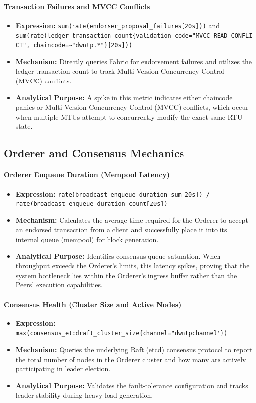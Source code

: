 \paragraph{Transaction Failures and MVCC Conflicts}
\begin{itemize}
    \item \textbf{Expression:} \verb|sum(rate(endorser_proposal_failures[20s]))| and \verb|sum(rate(ledger_transaction_count{validation_code="MVCC_READ_CONFLICT", chaincode=~"dwntp.*"}[20s]))|
    \item \textbf{Mechanism:} Directly queries Fabric for endorsement failures and utilizes the ledger transaction count to track Multi-Version Concurrency Control (MVCC) conflicts.
    \item \textbf{Analytical Purpose:} A spike in this metric indicates either chaincode panics or Multi-Version Concurrency Control (MVCC) conflicts, which occur when multiple MTUs attempt to concurrently modify the exact same RTU state.
\end{itemize}

\subsection{Orderer and Consensus Mechanics}

\paragraph{Orderer Enqueue Duration (Mempool Latency)}
\begin{itemize}
    \item \textbf{Expression:} \verb|rate(broadcast_enqueue_duration_sum[20s]) / rate(broadcast_enqueue_duration_count[20s])|
    \item \textbf{Mechanism:} Calculates the average time required for the Orderer to accept an endorsed transaction from a client and successfully place it into its internal queue (mempool) for block generation.
    \item \textbf{Analytical Purpose:} Identifies consensus queue saturation. When throughput exceeds the Orderer's limits, this latency spikes, proving that the system bottleneck lies within the Orderer's ingress buffer rather than the Peers' execution capabilities.
\end{itemize}

\paragraph{Consensus Health (Cluster Size and Active Nodes)}
\begin{itemize}
    \item \textbf{Expression:} \verb|max(consensus_etcdraft_cluster_size{channel="dwntpchannel"})|
    \item \textbf{Mechanism:} Queries the underlying Raft (etcd) consensus protocol to report the total number of nodes in the Orderer cluster and how many are actively participating in leader election.
    \item \textbf{Analytical Purpose:} Validates the fault-tolerance configuration and tracks leader stability during heavy load generation.
\end{itemize}


